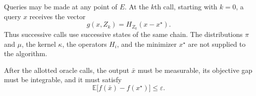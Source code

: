 \documentclass[10pt]{article}
\theoremstyle{definition}
\begin{document}
Queries may be made at any point of $E$. At the $k$th call, starting with $k=0$, a query $x$ receives the vector
\[
g(x,Z_k)=H_{Z_k}(x-x^\star).
\]
Thus successive calls use successive states of the same chain. The distributions $\pi$ and $\mu$, the kernel $\kappa$, the operators $H_i$, and the minimizer $x^\star$ are not supplied to the algorithm.

After the allotted oracle calls, the output $\bar{x}$ must be measurable, its objective gap must be integrable, and it must satisfy
\[
\mathbb{E}\bigl[f(\bar{x})-f(x^\star)\bigr]\leq\varepsilon.
\]
\end{document}
